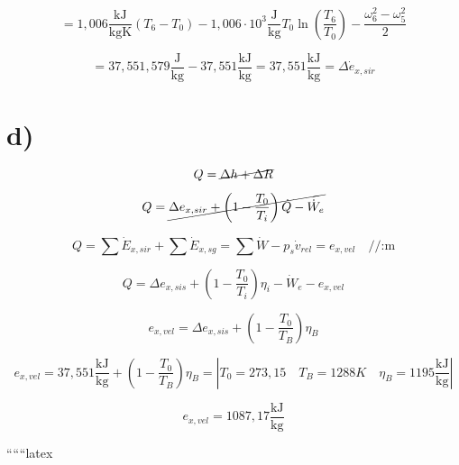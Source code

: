 \[
= 1,006 \frac{\text{kJ}}{\text{kgK}} (T_6 - T_0) - 1,006 \cdot 10^3 \frac{\text{J}}{\text{kg}} T_0 \ln \left( \frac{T_6}{T_0} \right) - \frac{\omega_6^2 - \omega_5^2}{2}
\]

\[
= 37,551,579 \frac{\text{J}}{\text{kg}} - 37,551 \frac{\text{kJ}}{\text{kg}} = 37,551 \frac{\text{kJ}}{\text{kg}} = \Delta \dot{e}_{x,sir}
\]

\section*{d)}

\[
Q = \cancel{\Delta h + \Delta R}
\]

\[
Q = \cancel{\Delta e_{x,sir} + \left( 1 - \frac{T_0}{T_i} \right) \dot{Q} - \dot{W}_e}
\]

\[
Q = \sum \dot{E}_{x,sir} + \sum \dot{E}_{x,sg} = \sum \dot{W} - p_s \dot{v}_{rel} = e_{x,vel} \quad \text{//:m}
\]

\[
Q = \Delta e_{x,sis} + \left( 1 - \frac{T_0}{T_i} \right) \eta_i - \dot{W}_e - e_{x,vel}
\]

\[
e_{x,vel} = \Delta e_{x,sis} + \left( 1 - \frac{T_0}{T_B} \right) \eta_B
\]

\[
e_{x,vel} = 37,551 \frac{\text{kJ}}{\text{kg}} + \left( 1 - \frac{T_0}{T_B} \right) \eta_B = \left| T_0 = 273,15 \quad T_B = 1288 K \quad \eta_B = 1195 \frac{\text{kJ}}{\text{kg}} \right|
\]

\[
e_{x,vel} = 1087,17 \frac{\text{kJ}}{\text{kg}}
\]

``````latex


